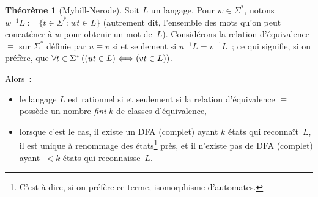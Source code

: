 \documentclass[12pt,a4paper]{article}
\theoremstyle{definition}
\newtheorem{thm}[comcnt]{Théorème}
\newcommand{\liff}{\mathrel{\Longleftrightarrow}\relax}
\begin{document}
\begin{thm}[Myhill-Nerode]\label{myhill-nerode}
Soit $L$ un langage.  Pour $w\in \Sigma^*$, notons $w^{-1} L := \{t
\in \Sigma^* : wt \in L\}$ (autrement dit, l'ensemble des mots qu'on
peut concaténer à $w$ pour obtenir un mot de $L$).  Considérons la
relation d'équivalence $\equiv$ sur $\Sigma^*$ définie par $u \equiv
v$ si et seulement si $u^{-1}L = v^{-1}L$ ; ce qui signifie, si on
préfère, que $\forall t\in \Sigma^*\,((ut\in L) \liff (vt \in L))$.

Alors :
\begin{itemize}
\item le langage $L$ est rationnel si et seulement si la relation
  d'équivalence $\equiv$ possède un nombre \emph{fini} $k$ de classes
  d'équivalence,
\item lorsque c'est le cas, il existe un DFA (complet) ayant $k$ états
  qui reconnaît $L$, il est unique à renommage des
  états\footnote{C'est-à-dire, si on préfère ce terme, isomorphisme
    d'automates.} près, et il n'existe pas de DFA (complet) ayant $<k$
  états qui reconnaisse $L$.
\end{itemize}
\end{thm}
\end{document}
